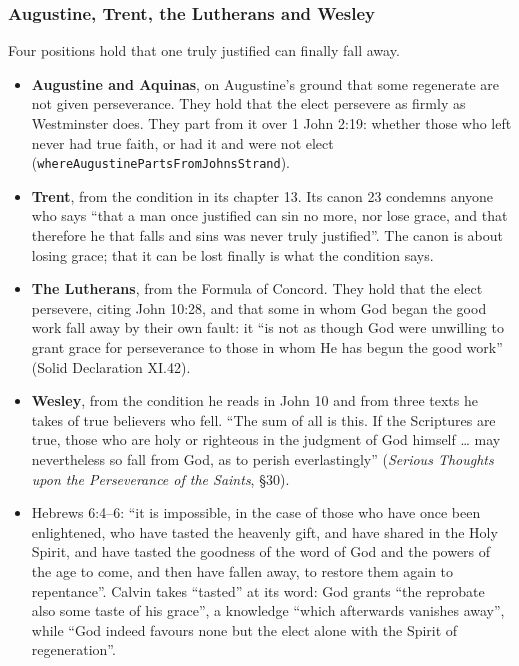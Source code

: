 \documentclass[11pt]{article}
\begin{document}
\subsubsection*{Augustine, Trent, the Lutherans and Wesley}
Four positions hold that one truly justified can finally fall away.

\begin{itemize}
  \item \textbf{Augustine and Aquinas}, on Augustine’s ground that some regenerate are not given perseverance. They hold that the elect persevere as firmly as Westminster does. They part from it over 1 John 2:19: whether those who left never had true faith, or had it and were not elect (\texttt{where\allowbreak{}Augustine\allowbreak{}Parts\allowbreak{}From\allowbreak{}Johns\allowbreak{}Strand}).
  \item \textbf{Trent}, from the condition in its chapter 13. Its canon 23 condemns anyone who says “that a man once justified can sin no more, nor lose grace, and that therefore he that falls and sins was never truly justified”. The canon is about losing grace; that it can be lost finally is what the condition says.
  \item \textbf{The Lutherans}, from the Formula of Concord. They hold that the elect persevere, citing John 10:28, and that some in whom God began the good work fall away by their own fault: it “is not as though God were unwilling to grant grace for perseverance to those in whom He has begun the good work” (Solid Declaration XI.42).
  \item \textbf{Wesley}, from the condition he reads in John 10 and from three texts he takes of true believers who fell. “The sum of all is this. If the Scriptures are true, those who are holy or righteous in the judgment of God himself … may nevertheless so fall from God, as to perish everlastingly” (\emph{Serious Thoughts upon the Perseverance of the Saints}, §30).
  \item Hebrews 6:4–6: “it is impossible, in the case of those who have once been enlightened, who have tasted the heavenly gift, and have shared in the Holy Spirit, and have tasted the goodness of the word of God and the powers of the age to come, and then have fallen away, to restore them again to repentance”. Calvin takes “tasted” at its word: God grants “the reprobate also some taste of his grace”, a knowledge “which afterwards vanishes away”, while “God indeed favours none but the elect alone with the Spirit of regeneration”.

\end{itemize}
\end{document}
